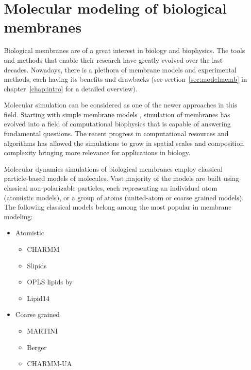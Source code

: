 \chapter{Molecular modeling of biological membranes}
\label{chap:methods}

Biological membranes are of a great interest in biology and biophysics. 
The tools and methods that enable their research have greatly evolved over the last decades. 
Nowadays, there is a plethora of membrane models and experimental methods, 
each having its benefits and drawbacks \citep{REF} 
(see section~\ref{sec:modelmemb} in chapter~\ref{chap:intro} for a detailed overview). 

Molecular simulation can be considered as one of the newer approaches in this field. 
Starting with simple membrane models \citep{REF} ,
simulation of membranes has evolved into a field of computational biophysics
that is capable of answering fundamental questions.
The recent progress in computational resources and algorithms
has allowed the simulations to grow in spatial scales and composition complexity
bringing more relevance for applications in biology. \citep{REF: CECAM workshop} 

Molecular dynamics simulations of biological membranes employ classical particle-based models of molecules. 
Vast majority of the models are built using classical non-polarizable particles, 
each representing an individual atom (atomistic models), 
or a group of atoms (united-atom or coarse grained models). 
The following classical models belong among the most popular in membrane modeling:
\begin{itemize}
 \item Atomistic
 \begin{itemize}
   \item CHARMM \citep{klauda10}
   \item Slipids \citep{jambeck12, jambeck12b}
   \item OPLS lipids by \citet{maciejewski14}
   \item Lipid14 \citep{dickson14}
  \end{itemize}

 \item Coarse grained
 \begin{itemize}
   \item MARTINI \citep{marrink07}
   \item Berger \citep{Berger97}
   \item CHARMM-UA \citep{lee14}
  \end{itemize}
\end{itemize}

